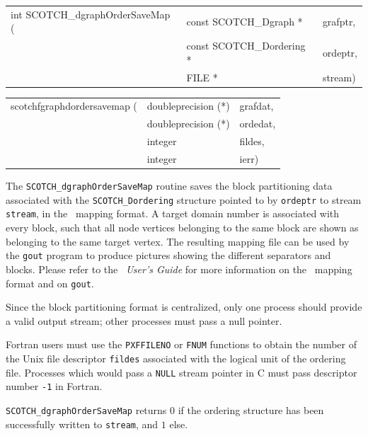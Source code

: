 \begin{itemize}
\progsyn

{\tt\begin{tabular}{l@{}ll}
int SCOTCH\_dgraphOrderSaveMap ( & const SCOTCH\_Dgraph *    & grafptr, \\
                                 & const SCOTCH\_Dordering * & ordeptr, \\
                                 & FILE *                    & stream)
\end{tabular}}

{\tt\begin{tabular}{l@{}ll}
scotchfgraphdordersavemap ( & doubleprecision (*) & grafdat, \\
                            & doubleprecision (*) & ordedat, \\
                            & integer             & fildes,  \\
                            & integer             & ierr)
\end{tabular}}

\progdes

The {\tt SCOTCH\_dgraphOrderSaveMap} routine saves the block
partitioning data associated with the {\tt SCOTCH\_\lbt Dordering}
structure pointed to by {\tt ordeptr} to stream {\tt stream}, in the
\scotch\ mapping format. A target domain number is associated with
every block, such that all node vertices belonging to the same block
are shown as belonging to the same target vertex.
The resulting mapping file can be used by the {\tt gout} program
to produce pictures showing the different separators and blocks.
Please refer to the {\it\scotch\ User's Guide} for more information
on the \scotch\ mapping format and on {\tt gout}.

Since the block partitioning format is centralized, only one process
should provide a valid output stream; other processes must pass a
null pointer.

Fortran users must use the {\tt PXFFILENO} or {\tt FNUM} functions to
obtain the number of the Unix file descriptor {\tt fildes} associated
with the logical unit of the ordering file. Processes which would pass
a {\tt NULL} stream pointer in C must pass descriptor number {\tt -1}
in Fortran.

\progret

{\tt SCOTCH\_dgraphOrderSaveMap} returns $0$ if the ordering structure
has been successfully written to {\tt stream}, and $1$ else.
\end{itemize}

